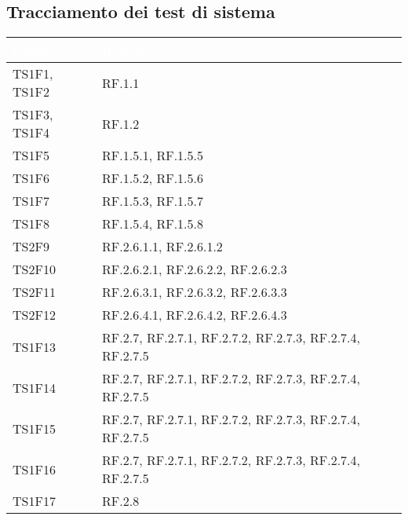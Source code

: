     \subsection{Tracciamento dei test di sistema }
    \begin{center}
        \renewcommand\arraystretch{1.5}
        \centering
        \begin{longtable}{|p{1.5cm}|p{11cm}|p{1cm}|}
        \hline
        \rowcolor[HTML]{036400}
        \textcolor{white}{\textbf{Codice}} & \textcolor{white}{\textbf{Requisito}} \\ \hline
            \rowcolor[HTML]{EFEFEF}
            TS1F1, TS1F2 & RF.1.1\\ \hline
            \rowcolor[HTML]{C0C0C0}
            TS1F3, TS1F4  & RF.1.2\\ \hline
            \rowcolor[HTML]{EFEFEF}
            TS1F5 & RF.1.5.1, RF.1.5.5\\ \hline
            \rowcolor[HTML]{C0C0C0}
            TS1F6 & RF.1.5.2, RF.1.5.6\\ \hline
            \rowcolor[HTML]{EFEFEF}
            TS1F7 & RF.1.5.3, RF.1.5.7\\ \hline
            \rowcolor[HTML]{C0C0C0}
            TS1F8 & RF.1.5.4, RF.1.5.8\\ \hline
            \rowcolor[HTML]{EFEFEF}
            TS2F9 & RF.2.6.1.1, RF.2.6.1.2\\ \hline
            \rowcolor[HTML]{C0C0C0}
            TS2F10 & RF.2.6.2.1, RF.2.6.2.2, RF.2.6.2.3 \\ \hline
            \rowcolor[HTML]{EFEFEF}
            TS2F11 & RF.2.6.3.1, RF.2.6.3.2, RF.2.6.3.3 \\ \hline
            \rowcolor[HTML]{C0C0C0}
            TS2F12 & RF.2.6.4.1, RF.2.6.4.2, RF.2.6.4.3\\ \hline
            \rowcolor[HTML]{EFEFEF}
            TS1F13 & RF.2.7, RF.2.7.1, RF.2.7.2, RF.2.7.3, RF.2.7.4, RF.2.7.5\\ \hline
            \rowcolor[HTML]{C0C0C0}
            TS1F14 & RF.2.7, RF.2.7.1, RF.2.7.2, RF.2.7.3, RF.2.7.4, RF.2.7.5\\ \hline
            \rowcolor[HTML]{EFEFEF}
            TS1F15 & RF.2.7, RF.2.7.1, RF.2.7.2, RF.2.7.3, RF.2.7.4, RF.2.7.5\\ \hline
            \rowcolor[HTML]{C0C0C0}
            TS1F16 & RF.2.7, RF.2.7.1, RF.2.7.2, RF.2.7.3, RF.2.7.4, RF.2.7.5\\ \hline
            \rowcolor[HTML]{EFEFEF}
            TS1F17 & RF.2.8\\ \hline

\end{longtable}
\end{center}
